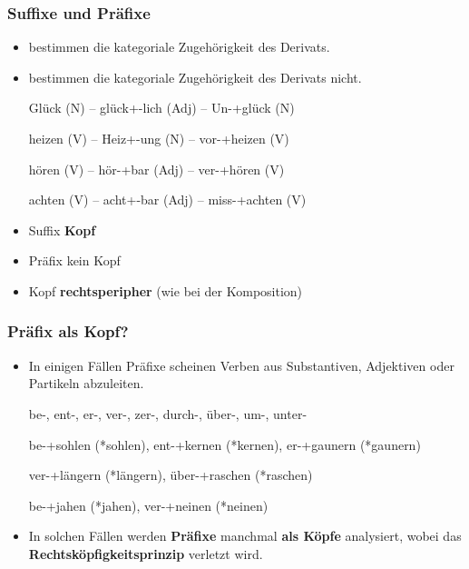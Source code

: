 \begin{frame}
\frametitle{Suffixe und Präfixe}

\begin{itemize}
	\item {} bestimmen die kategoriale Zugehörigkeit des Derivats.
	
	\item {} bestimmen \idR die kategoriale Zugehörigkeit des Derivats nicht.


	\ea Glück (N) -- glück+-lich (Adj) -- Un-+glück (N)
	\z
	
	\ea heizen (V) -- Heiz+-ung (N) -- vor-+heizen (V)
	\z
	
	\ea hören (V) -- hör-+bar (Adj) -- ver-+hören (V)
	\z
	
	\ea achten (V) -- acht+-bar (Adj) -- miss-+achten (V)
	\z

	\item Suffix \ras \textbf{Kopf}
	
	\item Präfix \ras kein Kopf

	\item Kopf  \ras \textbf{rechtsperipher} (wie bei der Komposition)
\end{itemize}

\end{frame}


\begin{frame}
\frametitle{Präfix als Kopf?}

\begin{itemize}
	\item In einigen Fällen Präfixe scheinen Verben aus Substantiven, Adjektiven oder Partikeln abzuleiten.

	\settowidth{} 			
	\ea be-, ent-, er-, ver-, zer-, durch-, über-, um-, unter- 
	\z 

		
		\ea be-+sohlen (*sohlen), ent-+kernen (*kernen), er-+gaunern (*gaunern)
		
		\jambox{[Substantivbasis]}

		\ex ver-+längern (*längern), über-+raschen (*raschen) \jambox{[Adjektivbasis]}
	
		\ex be-+jahen (*jahen), ver-+neinen (*neinen) \jambox{[Partikelbasis]}
		\z
		
\pause
\medskip

	\item In solchen Fällen werden \textbf{Präfixe} manchmal \textbf{als Köpfe} analysiert, wobei das \textbf{Rechtsköpfigkeitsprinzip} verletzt wird.
	
\end{itemize}

\end{frame}



